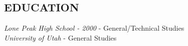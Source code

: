 \documentclass[line,margin]{res}
\begin{document}
\begin{resume}
\section{EDUCATION}
 {\sl Lone Peak High School - 2000} - General/Technical Studies\\
 {\sl University of Utah} - General Studies

\end{resume}
\end{document}
